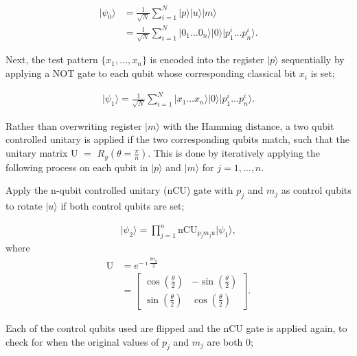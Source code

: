 \begin{align}
    \vert \psi_0 \rangle &= \frac{1}{\sqrt{N}}\sum\limits_{i=1}^{N} \vert p \rangle \vert u \rangle \vert m \rangle \\
    &= \frac{1}{\sqrt{N}}\sum\limits_{i=1}^{N} \vert 0_{1}\dots 0_{n} \rangle\vert 0 \rangle \vert p_1^{i}\dots p_n^{i} \rangle .
\end{align}

Next, the test pattern $\{x_1,\dots,x_n\}$ is encoded into the register $\vert p \rangle$ sequentially by applying a \textrm{NOT} gate to each qubit whose corresponding classical bit $x_i$ is set;

\begin{align}
    \vert \psi_1 \rangle = \frac{1}{\sqrt{N}}\sum\limits_{i=1}^{N} \vert x_{1}\dots x_{n} \rangle\vert 0 \rangle \vert p_1^{i}\dots p_n^{i} \rangle .
\end{align}

Rather than overwriting register $\vert m\rangle$ with the Hamming distance, a two qubit controlled unitary is applied if the two corresponding qubits match, such that the unitary matrix \textrm{U} $ = $ \textrm{$R_y$}$(\theta = \frac{\pi}{n})$. This is done by iteratively applying the following process on each qubit in $\vert p \rangle$ and $\vert m \rangle$ for $j = 1,\dots,n$. 

Apply the n-qubit controlled unitary (\textrm{nCU}) gate with $p_j$ and $m_j$ as control qubits to rotate $\vert u \rangle$ if both control qubits are set;

\begin{align}
\label{eq:hamming_ncu1}
    \vert \psi_2 \rangle =  \prod\limits_{j=1}^{n} \textrm{nCU}_{p_j m_j u} \vert \psi_1 \rangle ,
\end{align}
\noindent where
\begin{align}
\label{eq:hamming_ncu_U}
    \textrm{U} &= e^{-\imath \frac{\theta \sigma_y }{2}} \\
    &=
    \begin{bmatrix}
    \cos\left(\frac{\theta}{2}\right) & -\sin\left(\frac{\theta}{2}\right) \\
    \sin\left(\frac{\theta}{2}\right)  & \cos\left(\frac{\theta}{2}\right)
    \end{bmatrix}.
\end{align}

Each of the control qubits used are flipped and the \textrm{nCU} gate is applied again, to check for when the original values of $p_j$ and $m_j$ are both $0$;

